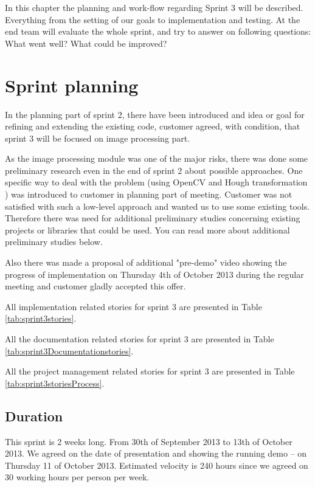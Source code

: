 In this chapter the planning and work-flow regarding Sprint 3 will be described. 
Everything from the setting of our goals to implementation and testing. At the end team will evaluate the whole sprint, and try to answer on following questions: What went well? What could be improved?  

\section{Sprint planning} \label{txt:sprint3_planning}
In the planning part of sprint 2, there have been introduced and idea or goal for refining and extending the existing code, customer agreed, with condition, that sprint 3 will be focused on image processing part.

As the image processing module was one of the major risks, there was done some preliminary research even in the end of sprint 2 about possible approaches.
One specific way to deal with the problem (using OpenCV and Hough transformation \cite{Duda:1972:UHT:361237.361242}) was introduced to customer in planning part of meeting.
Customer was not satisfied with such a low-level approach and wanted us to use some existing tools.
Therefore there was need for additional preliminary studies concerning existing projects or libraries that could be used.
You can read more about additional preliminary studies below.

Also there was made a proposal of additional "pre-demo" video showing the progress of implementation on Thursday 4th of October 2013 during the regular meeting and customer gladly accepted this offer.

All implementation related stories for sprint 3 are presented in Table \ref{tab:sprint3stories}.


All the documentation related stories for sprint 3 are presented in Table \ref{tab:sprint3Documentationstories}.

All the project management related stories for sprint 3 are presented in Table \ref{tab:sprint3storiesProcess}.


\subsection{Duration}
This sprint is 2 weeks long. From 30th of September 2013 to 13th of October 2013.
We agreed on the date of presentation and showing the running demo -- on Thursday 11 of October 2013.
Estimated velocity is 240 hours since we agreed on 30 working hours per person per week.

